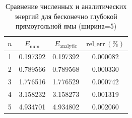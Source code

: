 \begin{table}[H]
  \centering
  \begin{tabular}{cccc}
    \toprule
    $n$ & $E_{\mathrm{num}}$ & $E_{\mathrm{analytic}}$ & $\mathrm{rel\_err}\, (\%)$ \\
    \midrule
    1 & 0.197392 & 0.197392 & 0.000082 \\
    2 & 0.789566 & 0.789568 & 0.000330 \\
    3 & 1.776516 & 1.776529 & 0.000742 \\
    4 & 3.158232 & 3.158273 & 0.001319 \\
    5 & 4.934701 & 4.934802 & 0.002060 \\
    \bottomrule
  \end{tabular}
  \caption{Сравнение численных и аналитических энергий для бесконечно глубокой прямоугольной ямы (ширина=5)}
\end{table}